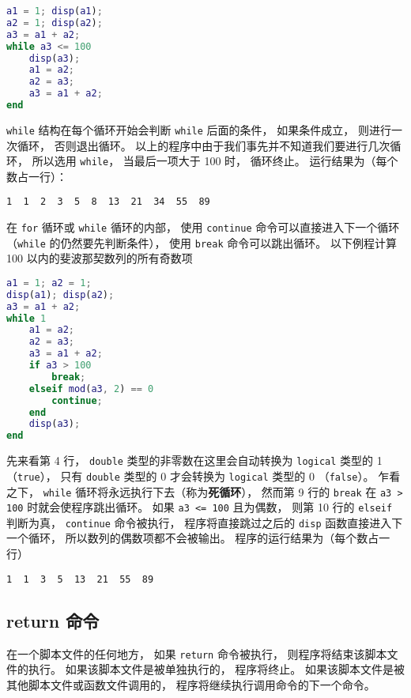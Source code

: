 \begin{lstlisting}[language=matlab, caption=fibonacci.m]
a1 = 1; disp(a1); 
a2 = 1; disp(a2);
a3 = a1 + a2;
while a3 <= 100
    disp(a3);
    a1 = a2;
    a2 = a3;
    a3 = a1 + a2;
end
\end{lstlisting}

\verb`while` 结构在每个循环开始会判断 \verb`while` 后面的条件， 如果条件成立， 则进行一次循环， 否则退出循环。 以上的程序中由于我们事先并不知道我们要进行几次循环， 所以选用 \verb`while`， 当最后一项大于 100 时， 循环终止。 运行结果为（每个数占一行）：
\begin{lstlisting}[language=matlabC]
1  1  2  3  5  8  13  21  34  55  89
\end{lstlisting}

在 \verb`for` 循环或 \verb`while` 循环的内部， 使用 \verb`continue` 命令可以直接进入下一个循环（\verb`while` 的仍然要先判断条件）， 使用 \verb`break` 命令可以跳出循环。 以下例程计算 100 以内的斐波那契数列的所有奇数项

\begin{lstlisting}[language=matlab, caption=fibonacciOdd.m]
a1 = 1; a2 = 1;
disp(a1); disp(a2);
a3 = a1 + a2;
while 1
    a1 = a2;
    a2 = a3;
    a3 = a1 + a2;
    if a3 > 100
        break;
    elseif mod(a3, 2) == 0
        continue;
    end
    disp(a3);
end
\end{lstlisting}

先来看第 4 行， \verb`double` 类型的非零数在这里会自动转换为 \verb`logical` 类型的 1 （\verb`true`）， 只有 \verb`double` 类型的 0 才会转换为 \verb`logical` 类型的 0 （\verb`false`）。 乍看之下， \verb`while` 循环将永远执行下去（称为\textbf{死循环}）， 然而第 9 行的 \verb`break` 在 \verb`a3 > 100` 时就会使程序跳出循环。 如果 \verb`a3 <= 100` 且为偶数， 则第 10 行的 \verb`elseif` 判断为真， \verb`continue` 命令被执行， 程序将直接跳过之后的 \verb`disp` 函数直接进入下一个循环， 所以数列的偶数项都不会被输出。 程序的运行结果为（每个数占一行）
\begin{lstlisting}[language=matlabC]
1  1  3  5  13  21  55  89
\end{lstlisting}

\subsection{return 命令}
在一个脚本文件的任何地方， 如果 \verb`return` 命令被执行， 则程序将结束该脚本文件的执行。 如果该脚本文件是被单独执行的， 程序将终止。 如果该脚本文件是被其他脚本文件或函数文件调用的， 程序将继续执行调用命令的下一个命令。
